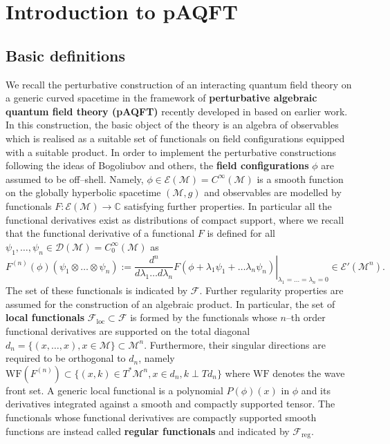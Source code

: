 \documentclass[a4paper,10pt,twoside]{article}
\numberwithin{equation}{section}
\newcounter{and}
\def\bbC{\mathbb{C}}
\def\M{\mathcal{M}}
\def\D{\mathcal{D}}
\def\WF{\mathrm{WF}}
\def\loc{\mathrm{loc}}
\def\reg{\mathrm{reg}}
\theoremstyle{plain}
\theoremstyle{definition}
\begin{document}
\bigskip


\section{Introduction to pAQFT}


\subsection{Basic definitions}
\label{sec:pAQFT.basic}

We recall the perturbative construction of an interacting quantum field theory on a generic curved spacetime in  the framework of {\bf perturbative algebraic quantum field theory (pAQFT)} recently developed in  \cite{BDF,FredenhagenRejzner,FredenhagenRejzner2} based on earlier work. 
In this construction, the basic object of the theory is an algebra of observables which is realised as a suitable set of functionals on field configurations equipped with a suitable product.
In order to implement the perturbative constructions following the ideas of Bogoliubov and others, the {\bf field configurations} $\phi$ are assumed to be off--shell. Namely, $\phi\in\mathcal{E}(\M)=C^\infty(\M)$ is a smooth function on the globally hyperbolic spacetime $(\M,g)$ and observables are modelled by functionals $F:\mathcal{E}(\M)\to \bbC$ satisfying further properties. In particular all the functional derivatives exist as distributions of compact support, where we recall that the functional derivative of a functional $F$ is defined for all $\psi_1,\ldots,\psi_n\in \D(\M)=C_0^\infty(\M)$ as
\[ 
F^{(n)}(\phi)(\psi_1\otimes \dots \otimes \psi_n) :=  \left.\frac{d^n}{d\lambda_1    \dots d\lambda_n } F(\phi + \lambda_1 \psi_1 +\dots \lambda_n \psi_n)\right|_{\lambda_1 = \dots=\lambda_n=0} \in \mathcal{E}'(\M^n).
\]
The set of these functionals is indicated by $\mathcal{F}$. 
Further regularity properties are assumed for the construction of an algebraic product.  In particular, the set of {\bf local functionals} $\mathcal{F}_\loc\subset \mathcal{F}$ is formed by the functionals whose $n$--th order functional derivatives are supported on the total diagonal $d_n = \{(x,\dots, x) , x\in \M\}\subset \M^n $. Furthermore, their singular directions are required to be orthogonal to $d_n$, namely $\WF(F^{(n)})\subset \{ (x,k) \in T^*\M^n, x\in d_n, k \perp  T d_n \}$ where $\WF$ denotes the wave front set. A generic local functional is a polynomial $P(\phi)(x)$ in $\phi$ and its derivatives integrated against a smooth and compactly supported tensor. The functionals whose functional derivatives are compactly supported smooth functions are instead called {\bf regular functionals} and indicated by $\mathcal{F}_\reg$.
\end{document}
